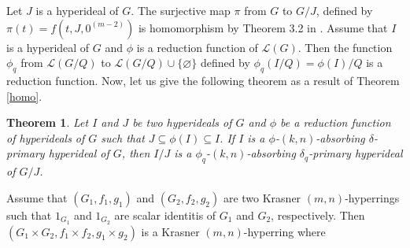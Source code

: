 \documentclass[preprint,review,10pt]{amsart}
\newtheorem{theorem}{Theorem}[section]
\theoremstyle{definition}
\theoremstyle{remark}
\numberwithin{equation}{section}
\begin{document}
Let $J$ is a hyperideal of $G$. The surjective map $\pi$ from $G$ to $G/J$, defined by $\pi(t)=f(t,J,0^{(m-2)})$ is homomorphism by Theorem 3.2 in \cite{sorc1}.
Assume that  $I$ is  a hyperideal of $G$ and $\phi$ is a reduction function of $\mathcal{L}(G)$. Then the function $\phi_q$ from $\mathcal{L}(G/Q)$ to $\mathcal{L}(G/Q) \cup \{\varnothing\}$ defined by $\phi_q(I/Q)=\phi(I)/Q$ is a reduction function. Now, let us give the following theorem as a result of Theorem \ref{homo}.
\begin{theorem}
Let $I$ and $J$ be  two  hyperideals of $G$ and $\phi$ be a reduction function of hyperideals of $G$ such that $J \subseteq \phi(I) \subseteq I$. If $I$ is a $\phi$-$(k,n)$-absorbing $\delta$-primary hyperideal of $G$, then $I/J$ is a $\phi_q$-$(k,n)$-absorbing $\delta_q$-primary hyperideal of $G/J$.
\end{theorem}




 
 
Assume that 
 $(G_1, f_1, g_1)$ and $(G_2, f_2, g_2)$ are two Krasner $(m,n)$-hyperrings such that $1_{G_1}$ and $1_{G_2}$ are scalar identitis of $G_1$ and $G_2$, respectively. Then 
  $(G_1 \times G_2, f_1\times f_2 ,g_1 \times g_2 )$ is a Krasner $(m, n)$-hyperring where
\end{document}
